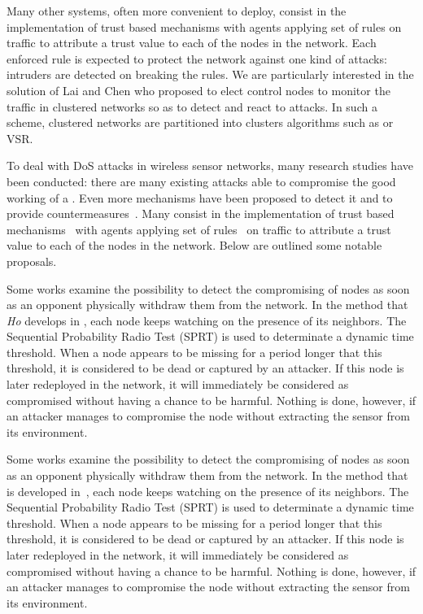 Many other systems, often more convenient to deploy, consist in the implementation of trust based mechanisms\cite{MC10,F-GRL07} with agents applying set of rules\cite{RKKK13} on traffic to attribute a trust value to each of the nodes in the network.
Each enforced rule is expected to protect the network against one kind of attacks: intruders are detected on breaking the rules.
We are particularly interested in the solution of Lai and Chen\cite{LC08} who proposed to elect control nodes to monitor the traffic in clustered networks so as to detect and react to \dos attacks.
In such a scheme, clustered networks are partitioned into clusters \via algorithms such as \leach\cite{HHT02} or VSR\cite{TV08}.





To deal with DoS attacks in wireless sensor networks, many research studies have been conducted: there are many existing attacks able to compromise the good working of a \wsn.
Even more mechanisms have been proposed to detect it and to provide countermeasures~\cite{SSS11}.
Many consist in the implementation of trust based mechanisms~\cite{MC10,F-GRL07} with agents applying set of rules~\cite{RKKK13} on traffic to attribute a trust value to each of the nodes in the network.
Below are outlined some notable proposals.


Some works examine the possibility to detect the compromising of nodes as soon as an opponent physically withdraw them from the network.
In the method that \textit{Ho} develops in
\cite{Ho10},
each node keeps watching on the presence of its neighbors.
The Sequential Probability Radio Test (SPRT) is used to determinate a dynamic time threshold.
When a node appears to be missing for a period longer that this threshold, it is considered to be dead or captured by an attacker.
If this node is later redeployed in the network, it will immediately be considered as compromised without having a chance to be harmful.
Nothing is done, however, if an attacker manages to compromise the node without extracting the sensor from its environment.

Some works examine the possibility to detect the compromising of nodes as soon as an opponent physically withdraw them from the network.
In the method that is developed in~\cite{Ho10}, each node keeps watching on the presence of its neighbors.
The Sequential Probability Radio Test (SPRT) is used to determinate a dynamic time threshold.
When a node appears to be missing for a period longer that this threshold, it is considered to be dead or captured by an attacker.
If this node is later redeployed in the network, it will immediately be considered as compromised without having a chance to be harmful.
Nothing is done, however, if an attacker manages to compromise the node without extracting the sensor from its environment.

